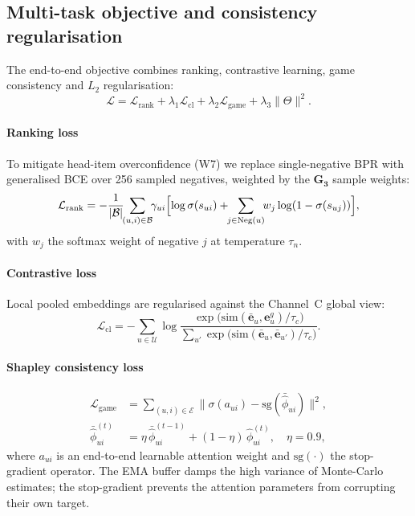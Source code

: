 \documentclass[final,5p,times,twocolumn]{elsarticle}
\begin{document}
\subsection{Multi-task objective and consistency regularisation}
\label{sec:loss}

The end-to-end objective combines ranking, contrastive learning, game
consistency and $L_2$ regularisation:
\begin{equation}
\mathcal{L} = \mathcal{L}_{\mathrm{rank}}
+ \lambda_1 \mathcal{L}_{\mathrm{cl}}
+ \lambda_2 \mathcal{L}_{\mathrm{game}}
+ \lambda_3 \lVert \Theta \rVert^2 .
\label{eq:total}
\end{equation}

\paragraph{Ranking loss}
To mitigate head-item overconfidence (W7) we replace single-negative BPR with
generalised BCE over 256 sampled negatives, weighted by the $\mathbf{G_3}$
sample weights:
\begin{equation}
\mathcal{L}_{\mathrm{rank}} = -\frac{1}{|\mathcal{B}|}\!\!
\sum_{(u,i) \in \mathcal{B}}\!\! \gamma_{ui}
\Bigl[ \log \sigma(s_{ui}) + \!\!\sum_{j \in \mathrm{Neg}(u)}\!\!
w_j \log(1 - \sigma(s_{uj})) \Bigr],
\end{equation}
with $w_j$ the softmax weight of negative $j$ at temperature $\tau_n$.

\paragraph{Contrastive loss}
Local pooled embeddings are regularised against the Channel~C global view:
\begin{equation}
\mathcal{L}_{\mathrm{cl}} = -\sum_{u \in \mathcal{U}}
\log \frac{\exp\bigl(\mathrm{sim}(\bar{\mathbf{e}}_u,
\mathbf{e}^{g}_u)/\tau_c\bigr)}
{\sum_{u'} \exp\bigl(\mathrm{sim}(\bar{\mathbf{e}}_u,
\bar{\mathbf{e}}_{u'})/\tau_c\bigr)} .
\end{equation}

\paragraph{Shapley consistency loss}
\begin{align}
\mathcal{L}_{\mathrm{game}} &= \sum_{(u,i) \in \mathcal{E}}
\bigl\lVert \sigma(a_{ui}) - \mathrm{sg}(\bar{\hat{\phi}}_{ui})
\bigr\rVert^2, \label{eq:game}\\
\bar{\hat{\phi}}^{(t)}_{ui} &= \eta\, \bar{\hat{\phi}}^{(t-1)}_{ui}
+ (1-\eta)\, \hat{\phi}^{(t)}_{ui}, \quad \eta = 0.9,
\end{align}
where $a_{ui}$ is an end-to-end learnable attention weight and
$\mathrm{sg}(\cdot)$ the stop-gradient operator. The EMA buffer damps the high
variance of Monte-Carlo estimates; the stop-gradient prevents the attention
parameters from corrupting their own target.
\end{document}
